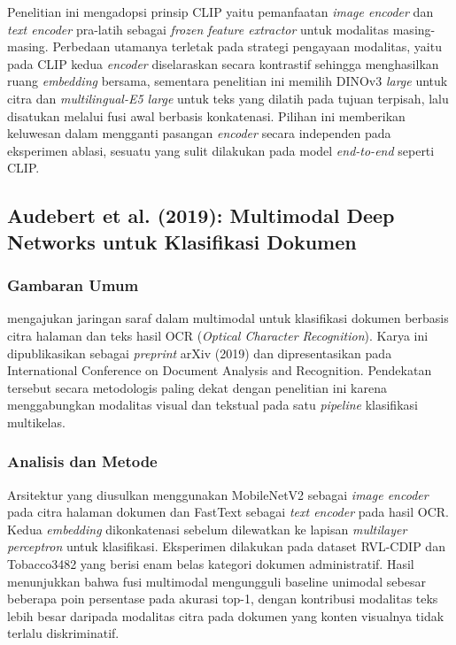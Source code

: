 Penelitian ini mengadopsi prinsip CLIP yaitu pemanfaatan \textit{image encoder} dan \textit{text encoder} pra-latih sebagai \textit{frozen feature extractor} untuk modalitas masing-masing. Perbedaan utamanya terletak pada strategi pengayaan modalitas, yaitu pada CLIP kedua \textit{encoder} diselaraskan secara kontrastif sehingga menghasilkan ruang \textit{embedding} bersama, sementara penelitian ini memilih DINOv3 \textit{large} untuk citra dan \textit{multilingual-E5 large} untuk teks yang dilatih pada tujuan terpisah, lalu disatukan melalui fusi awal berbasis konkatenasi. Pilihan ini memberikan keluwesan dalam mengganti pasangan \textit{encoder} secara independen pada eksperimen ablasi, sesuatu yang sulit dilakukan pada model \textit{end-to-end} seperti CLIP.

\subsection{Audebert et al. (2019): Multimodal Deep Networks untuk Klasifikasi Dokumen}

\subsubsection{Gambaran Umum}

\citet{audebertMultimodalDoc2019} mengajukan jaringan saraf dalam multimodal untuk klasifikasi dokumen berbasis citra halaman dan teks hasil OCR (\textit{Optical Character Recognition}). Karya ini dipublikasikan sebagai \textit{preprint} arXiv (2019) dan dipresentasikan pada International Conference on Document Analysis and Recognition. Pendekatan tersebut secara metodologis paling dekat dengan penelitian ini karena menggabungkan modalitas visual dan tekstual pada satu \textit{pipeline} klasifikasi multikelas.

\subsubsection{Analisis dan Metode}

Arsitektur yang diusulkan menggunakan MobileNetV2 sebagai \textit{image encoder} pada citra halaman dokumen dan FastText sebagai \textit{text encoder} pada hasil OCR. Kedua \textit{embedding} dikonkatenasi sebelum dilewatkan ke lapisan \textit{multilayer perceptron} untuk klasifikasi. Eksperimen dilakukan pada dataset RVL-CDIP dan Tobacco3482 yang berisi enam belas kategori dokumen administratif. Hasil menunjukkan bahwa fusi multimodal mengungguli baseline unimodal sebesar beberapa poin persentase pada akurasi top-1, dengan kontribusi modalitas teks lebih besar daripada modalitas citra pada dokumen yang konten visualnya tidak terlalu diskriminatif.

